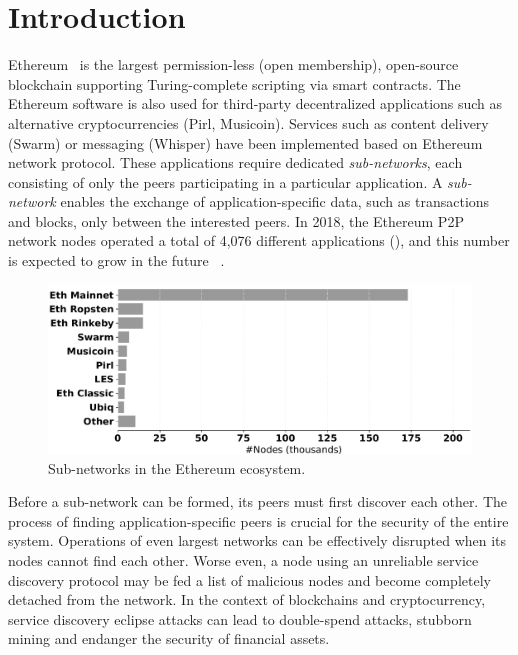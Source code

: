 
\section{Introduction}

Ethereum~\cite{buterin2013ethereum}  is the largest permission-less (\ie open membership), open-source blockchain supporting Turing-complete scripting via smart contracts. 
The Ethereum software is also used for third-party decentralized applications such as alternative cryptocurrencies (Pirl, Musicoin). Services such as content delivery (Swarm) or messaging (Whisper) have been implemented based on Ethereum network protocol.
These applications require dedicated \emph{sub-networks}, each consisting of only the peers participating in a particular application. A \emph{sub-network} enables the exchange of application-specific data, such as transactions and blocks, only between the interested peers. In 2018, the Ethereum P2P network nodes operated a total of 4,076 different applications (), and this number is expected to grow in the future~\cite{kim2018measuring} .

\begin{figure}
    \includegraphics[width=1\linewidth]{img/ecosystem}
    \caption{Sub-networks in the Ethereum ecosystem.}
    \label{fig:ecosystem}
\end{figure}

Before a sub-network can be formed, its peers must first discover each other. The process of finding application-specific peers is crucial for the security of the entire system. Operations of even largest networks can be effectively disrupted when its nodes cannot find each other. Worse even, a node using an unreliable service discovery protocol may be fed a list of malicious nodes and become completely detached from the network. In the context of blockchains and cryptocurrency, service discovery eclipse attacks can lead to double-spend attacks, stubborn mining and endanger the security of financial assets.

